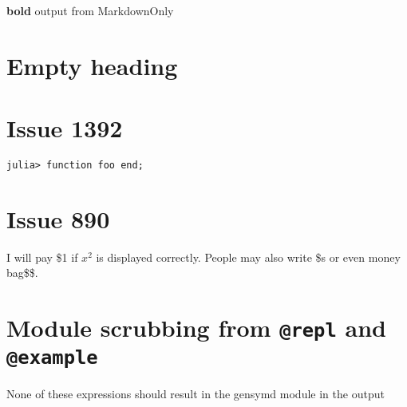 \textbf{bold} output from MarkdownOnly



\chapter{Empty heading}



\label{12121464878615854585}{}


\section{}



\label{13633231208144796923}{}


\chapter{Issue 1392}



\label{987107409634109244}{}



\begin{lstlisting}[]
julia> function foo end;
\end{lstlisting}



\chapter{Issue 890}



\label{16901975118583039516}{}


I will pay \$1 if \(x^2\) is displayed correctly. People may also write \$s or even money bag\$\$.



\chapter{Module scrubbing from \texttt{@repl} and \texttt{@example}}



\label{12500314249427487157}{}


None of these expressions should result in the gensym{\textquotesingle}d module in the output




